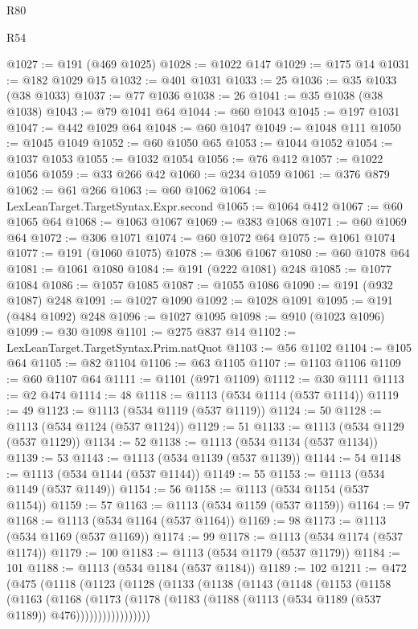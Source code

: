 \begin{lexlean}{R80}
\begin{lexlean}{R54}
\begin{coremodule}
{{{{{{{{{{{{{{{{{{{{{{{{{{{{{{{{{{{{{{{{{{{{{{{{{{@1027 := @191 (@469 @1025)
@1028 := @1022 @147
@1029 := @175 @14
@1031 := @182 @1029 @15
@1032 := @401 @1031
@1033 := 25
@1036 := @35 @1033 (@38 @1033)
@1037 := @77 @1036
@1038 := 26
@1041 := @35 @1038 (@38 @1038)
@1043 := @79 @1041 @64
@1044 := @60 @1043
@1045 := @197 @1031
@1047 := @442 @1029 @64
@1048 := @60 @1047
@1049 := @1048 @111
@1050 := @1045 @1049
@1052 := @60 @1050 @65
@1053 := @1044 @1052
@1054 := @1037 @1053
@1055 := @1032 @1054
@1056 := @76 @412
@1057 := @1022 @1056
@1059 := @33 @266 @42
@1060 := @234 @1059
@1061 := @376 @879
@1062 := @61 @266
@1063 := @60 @1062
@1064 := LexLeanTarget.TargetSyntax.Expr.second
@1065 := @1064 @412
@1067 := @60 @1065 @64
@1068 := @1063 @1067
@1069 := @383 @1068
@1071 := @60 @1069 @64
@1072 := @306 @1071
@1074 := @60 @1072 @64
@1075 := @1061 @1074
@1077 := @191 (@1060 @1075)
@1078 := @306 @1067
@1080 := @60 @1078 @64
@1081 := @1061 @1080
@1084 := @191 (@222 @1081) @248
@1085 := @1077 @1084
@1086 := @1057 @1085
@1087 := @1055 @1086
@1090 := @191 (@932 @1087) @248
@1091 := @1027 @1090
@1092 := @1028 @1091
@1095 := @191 (@484 @1092) @248
@1096 := @1027 @1095
@1098 := @910 (@1023 @1096)
@1099 := @30 @1098
@1101 := @275 @837 @14
@1102 := LexLeanTarget.TargetSyntax.Prim.natQuot
@1103 := @56 @1102
@1104 := @105 @64
@1105 := @82 @1104
@1106 := @63 @1105
@1107 := @1103 @1106
@1109 := @60 @1107 @64
@1111 := @1101 (@971 @1109)
@1112 := @30 @1111
@1113 := @2 @474
@1114 := 48
@1118 := @1113 (@534 @1114 (@537 @1114))
@1119 := 49
@1123 := @1113 (@534 @1119 (@537 @1119))
@1124 := 50
@1128 := @1113 (@534 @1124 (@537 @1124))
@1129 := 51
@1133 := @1113 (@534 @1129 (@537 @1129))
@1134 := 52
@1138 := @1113 (@534 @1134 (@537 @1134))
@1139 := 53
@1143 := @1113 (@534 @1139 (@537 @1139))
@1144 := 54
@1148 := @1113 (@534 @1144 (@537 @1144))
@1149 := 55
@1153 := @1113 (@534 @1149 (@537 @1149))
@1154 := 56
@1158 := @1113 (@534 @1154 (@537 @1154))
@1159 := 57
@1163 := @1113 (@534 @1159 (@537 @1159))
@1164 := 97
@1168 := @1113 (@534 @1164 (@537 @1164))
@1169 := 98
@1173 := @1113 (@534 @1169 (@537 @1169))
@1174 := 99
@1178 := @1113 (@534 @1174 (@537 @1174))
@1179 := 100
@1183 := @1113 (@534 @1179 (@537 @1179))
@1184 := 101
@1188 := @1113 (@534 @1184 (@537 @1184))
@1189 := 102
@1211 := @472
    (@475
      (@1118
        (@1123
          (@1128
            (@1133
              (@1138
                (@1143
                  (@1148
                    (@1153
                      (@1158
                        (@1163
                          (@1168
                            (@1173
                              (@1178
                                (@1183 (@1188 (@1113 (@534 @1189 (@537 @1189)) @476)))))))))))))))))
}}}}}}}}}}}}}}}}}}}}}}}}}}}}}}}}}}}}}}}}}}}}}}}}}}
\end{coremodule}
\end{lexlean}
\end{lexlean}
